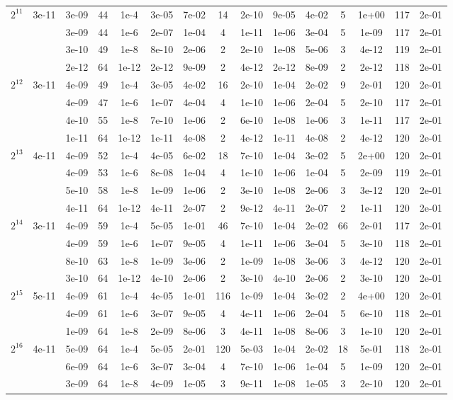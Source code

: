 \documentclass[11pt]{article}
\begin{document}
\begin{table}[!htbp]
\begin{tabular}{|c|c|c|c|c|c|c|c|c|c|c|c|c|c|c|}
\hline
$2^{11}$ & 3e-11 & 3e-09 & 44 & 1e-4 & 3e-05 & 7e-02 & 14 & 2e-10 & 9e-05 & 4e-02 & 5 & 1e+00 & 117 & 2e-01\\
~ & ~ & 3e-09 & 44 & 1e-6 & 2e-07 & 1e-04 & 4 & 1e-11 & 1e-06 & 3e-04 & 5 & 1e-09 & 117 & 2e-01\\
~ & ~ & 3e-10 & 49 & 1e-8 & 8e-10 & 2e-06 & 2 & 2e-10 & 1e-08 & 5e-06 & 3 & 4e-12 & 119 & 2e-01\\
~ & ~ & 2e-12 & 64 & 1e-12 & 2e-12 & 9e-09 & 2 & 4e-12 & 2e-12 & 8e-09 & 2 & 2e-12 & 118 & 2e-01\\
\hline
$2^{12}$ & 3e-11 & 4e-09 & 49 & 1e-4 & 3e-05 & 4e-02 & 16 & 2e-10 & 1e-04 & 2e-02 & 9 & 2e-01 & 120 & 2e-01\\
~ & ~ & 4e-09 & 47 & 1e-6 & 1e-07 & 4e-04 & 4 & 1e-10 & 1e-06 & 2e-04 & 5 & 2e-10 & 117 & 2e-01\\
~ & ~ & 4e-10 & 55 & 1e-8 & 7e-10 & 1e-06 & 2 & 6e-10 & 1e-08 & 1e-06 & 3 & 1e-11 & 117 & 2e-01\\
~ & ~ & 1e-11 & 64 & 1e-12 & 1e-11 & 4e-08 & 2 & 4e-12 & 1e-11 & 4e-08 & 2 & 4e-12 & 120 & 2e-01\\
\hline
$2^{13}$ & 4e-11 & 4e-09 & 52 & 1e-4 & 4e-05 & 6e-02 & 18 & 7e-10 & 1e-04 & 3e-02 & 5 & 2e+00 & 120 & 2e-01\\
~ & ~ & 4e-09 & 53 & 1e-6 & 8e-08 & 1e-04 & 4 & 1e-10 & 1e-06 & 1e-04 & 5 & 2e-09 & 119 & 2e-01\\
~ & ~ & 5e-10 & 58 & 1e-8 & 1e-09 & 1e-06 & 2 & 3e-10 & 1e-08 & 2e-06 & 3 & 3e-12 & 120 & 2e-01\\
~ & ~ & 4e-11 & 64 & 1e-12 & 4e-11 & 2e-07 & 2 & 9e-12 & 4e-11 & 2e-07 & 2 & 1e-11 & 120 & 2e-01\\
\hline
$2^{14}$ & 3e-11 & 4e-09 & 59 & 1e-4 & 5e-05 & 1e-01 & 46 & 7e-10 & 1e-04 & 2e-02 & 66 & 2e-01 & 117 & 2e-01\\
~ & ~ & 4e-09 & 59 & 1e-6 & 1e-07 & 9e-05 & 4 & 1e-11 & 1e-06 & 3e-04 & 5 & 3e-10 & 118 & 2e-01\\
~ & ~ & 8e-10 & 63 & 1e-8 & 1e-09 & 3e-06 & 2 & 1e-09 & 1e-08 & 3e-06 & 3 & 4e-12 & 120 & 2e-01\\
~ & ~ & 3e-10 & 64 & 1e-12 & 4e-10 & 2e-06 & 2 & 3e-10 & 4e-10 & 2e-06 & 2 & 3e-10 & 120 & 2e-01\\
\hline
$2^{15}$ & 5e-11 & 4e-09 & 61 & 1e-4 & 4e-05 & 1e-01 & 116 & 1e-09 & 1e-04 & 3e-02 & 2 & 4e+00 & 120 & 2e-01\\
~ & ~ & 4e-09 & 61 & 1e-6 & 3e-07 & 9e-05 & 4 & 4e-11 & 1e-06 & 2e-04 & 5 & 6e-10 & 118 & 2e-01\\
~ & ~ & 1e-09 & 64 & 1e-8 & 2e-09 & 8e-06 & 3 & 4e-11 & 1e-08 & 8e-06 & 3 & 1e-10 & 120 & 2e-01\\
\hline
$2^{16}$ & 4e-11 & 5e-09 & 64 & 1e-4 & 5e-05 & 2e-01 & 120 & 5e-03 & 1e-04 & 2e-02 & 18 & 5e-01 & 118 & 2e-01\\
~ & ~ & 6e-09 & 64 & 1e-6 & 3e-07 & 3e-04 & 4 & 7e-10 & 1e-06 & 1e-04 & 5 & 1e-09 & 120 & 2e-01\\
~ & ~ & 3e-09 & 64 & 1e-8 & 4e-09 & 1e-05 & 3 & 9e-11 & 1e-08 & 1e-05 & 3 & 2e-10 & 120 & 2e-01\\




\end{tabular}
\end{table}
\end{document}
